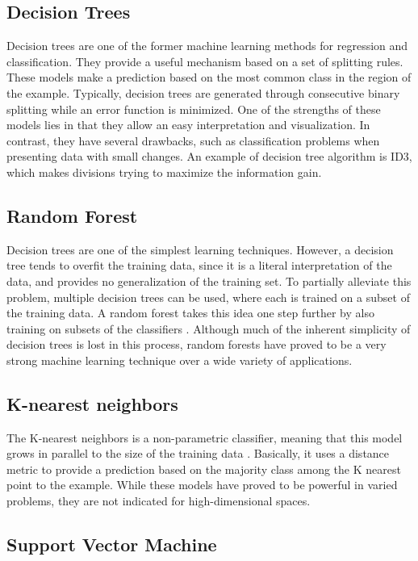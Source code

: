 \subsection{Decision Trees}

Decision trees are one of the former machine learning methods for regression and classification.
They provide a useful mechanism based on a set of splitting rules. These models make
a prediction based on the most common class in the region of the example. Typically, decision
trees are generated through consecutive binary splitting while an error function is minimized. One
of the strengths of these models lies in that they allow an easy interpretation and visualization.
In contrast, they have several drawbacks, such as classification problems when presenting data
with small changes. An example of decision tree algorithm is ID3, which makes divisions
trying to maximize the information gain.

\subsection{Random Forest}

Decision trees are one of the simplest learning
techniques. However, a decision tree tends to overfit
the training data, since it is a literal interpretation of
the data, and provides no generalization of the training set. To partially alleviate this problem,
multiple decision trees can be used, where each is
trained on a subset of the training data. A random
forest takes this idea one step further by also training
on subsets of the classifiers \cite{breiman}.
Although much of the inherent simplicity of decision
trees is lost in this process, random forests have
proved to be a very strong machine learning
technique over a wide variety of applications. 

\subsection{K-nearest neighbors}

The K-nearest neighbors is a non-parametric classifier, meaning that this model grows in parallel
to the size of the training data \cite{rob14}. Basically, it uses a distance metric to provide a prediction
based on the majority class among the K nearest point to the example. While these models have
proved to be powerful in varied problems, they are not indicated for high-dimensional spaces.

\subsection{Support Vector Machine}

